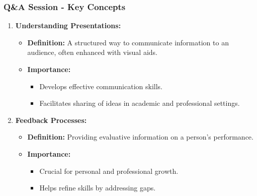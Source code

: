\documentclass[aspectratio=169]{beamer}
\begin{document}
\begin{frame}[fragile]
    \frametitle{Q\&A Session - Key Concepts}
    \begin{enumerate}
        \item \textbf{Understanding Presentations:}
            \begin{itemize}
                \item \textbf{Definition:} A structured way to communicate information to an audience, often enhanced with visual aids.
                \item \textbf{Importance:}
                    \begin{itemize}
                        \item Develops effective communication skills.
                        \item Facilitates sharing of ideas in academic and professional settings.
                    \end{itemize}
            \end{itemize}
        \item \textbf{Feedback Processes:}
            \begin{itemize}
                \item \textbf{Definition:} Providing evaluative information on a person's performance.
                \item \textbf{Importance:}
                    \begin{itemize}
                        \item Crucial for personal and professional growth.
                        \item Helps refine skills by addressing gaps.
                    \end{itemize}
            \end{itemize}
    \end{enumerate}
\end{frame}
\end{document}
